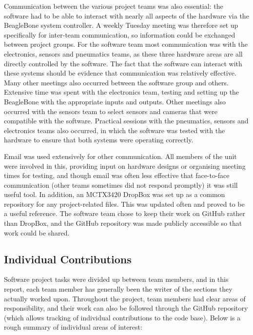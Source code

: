 Communication between the various project teams was also essential: the software had to be able to interact with nearly all aspects of the hardware via the BeagleBone system controller.  A weekly Tuesday meeting was therefore set up specifically for inter-team communication, so information could be exchanged between project groups. For the software team most communication was with the electronics, sensors and pneumatics teams, as these three hardware areas are all directly controlled by the software. The fact that the software can interact with these systems should be evidence that communication was relatively effective.
Many other meetings also occurred between the software group and others. Extensive time was spent with the electronics team, testing and setting up the BeagleBone with the appropriate inputs and outputs. Other meetings also occurred with the sensors team to select sensors and cameras that were compatible with the software. Practical sessions with the pneumatics, sensors and electronics teams also occurred, in which the software was tested with the hardware to ensure that both systems were operating correctly.


Email was used extensively for other communication. All members of the unit were involved in this, providing input on hardware designs or organising meeting times for testing, and though email was often less effective that face-to-face communication (other teams sometimes did not respond promptly) it was still useful tool. In addition, an MCTX3420 DropBox was set up as a common repository for any project-related files. This was updated often and proved to be a useful reference. The software team chose to keep their work on GitHub rather than DropBox, and the GitHub repository was made publicly accessible so that work could be shared.

\subsection{Individual Contributions}

Software project tasks were divided up between team members, and in this report, each team member has generally been the writer of the sections they actually worked upon. Throughout the project, team members had clear areas of responsibility, and their work can also be followed through the GitHub repository (which allows tracking of individual contributions to the code base). Below is a rough summary of individual areas of interest:


